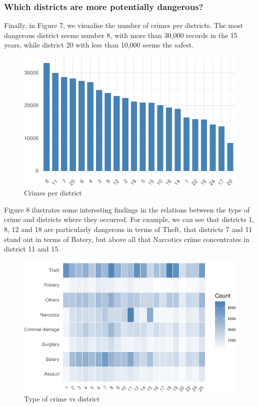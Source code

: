 \documentclass[]{article}
\begin{document}
\pagebreak

\subsubsection{Which districts are more potentially
dangerous?}\label{which-districts-are-more-potentially-dangerous}

Finally, in Figure 7, we visualise the number of crimes per districts.
The most dangerous district seems number 8, with more than 30,000
records in the 15 years, while district 20 with less than 10,000 seems
the safest.

\begin{figure}[htbp]
\centering
\includegraphics{201081646_MATH5741M_files/figure-latex/fig7-1.pdf}
\caption{Crimes per district}
\end{figure}

Figure 8 ilustrates some interesting findings in the relations between
the type of crime and districts where they occurred. For example, we can
see that districts 1, 8, 12 and 18 are particularly dangerous in terms
of Theft, that districts 7 and 11 stand out in terms of Batery, but
above all that Narcotics crime concentrates in district 11 and 15.

\begin{figure}[H]

{\centering \includegraphics{201081646_MATH5741M_files/figure-latex/fig8-1} 

}

\caption{Type of crime vs district}\label{fig:fig8}
\end{figure}
\end{document}
